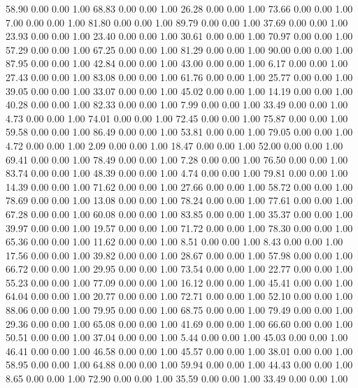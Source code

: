    58.90   0.00   0.00   1.00
   68.83   0.00   0.00   1.00
   26.28   0.00   0.00   1.00
   73.66   0.00   0.00   1.00
    7.00   0.00   0.00   1.00
   81.80   0.00   0.00   1.00
   89.79   0.00   0.00   1.00
   37.69   0.00   0.00   1.00
   23.93   0.00   0.00   1.00
   23.40   0.00   0.00   1.00
   30.61   0.00   0.00   1.00
   70.97   0.00   0.00   1.00
   57.29   0.00   0.00   1.00
   67.25   0.00   0.00   1.00
   81.29   0.00   0.00   1.00
   90.00   0.00   0.00   1.00
   87.95   0.00   0.00   1.00
   42.84   0.00   0.00   1.00
   43.00   0.00   0.00   1.00
    6.17   0.00   0.00   1.00
   27.43   0.00   0.00   1.00
   83.08   0.00   0.00   1.00
   61.76   0.00   0.00   1.00
   25.77   0.00   0.00   1.00
   39.05   0.00   0.00   1.00
   33.07   0.00   0.00   1.00
   45.02   0.00   0.00   1.00
   14.19   0.00   0.00   1.00
   40.28   0.00   0.00   1.00
   82.33   0.00   0.00   1.00
    7.99   0.00   0.00   1.00
   33.49   0.00   0.00   1.00
    4.73   0.00   0.00   1.00
   74.01   0.00   0.00   1.00
   72.45   0.00   0.00   1.00
   75.87   0.00   0.00   1.00
   59.58   0.00   0.00   1.00
   86.49   0.00   0.00   1.00
   53.81   0.00   0.00   1.00
   79.05   0.00   0.00   1.00
    4.72   0.00   0.00   1.00
    2.09   0.00   0.00   1.00
   18.47   0.00   0.00   1.00
   52.00   0.00   0.00   1.00
   69.41   0.00   0.00   1.00
   78.49   0.00   0.00   1.00
    7.28   0.00   0.00   1.00
   76.50   0.00   0.00   1.00
   83.74   0.00   0.00   1.00
   48.39   0.00   0.00   1.00
    4.74   0.00   0.00   1.00
   79.81   0.00   0.00   1.00
   14.39   0.00   0.00   1.00
   71.62   0.00   0.00   1.00
   27.66   0.00   0.00   1.00
   58.72   0.00   0.00   1.00
   78.69   0.00   0.00   1.00
   13.08   0.00   0.00   1.00
   78.24   0.00   0.00   1.00
   77.61   0.00   0.00   1.00
   67.28   0.00   0.00   1.00
   60.08   0.00   0.00   1.00
   83.85   0.00   0.00   1.00
   35.37   0.00   0.00   1.00
   39.97   0.00   0.00   1.00
   19.57   0.00   0.00   1.00
   71.72   0.00   0.00   1.00
   78.30   0.00   0.00   1.00
   65.36   0.00   0.00   1.00
   11.62   0.00   0.00   1.00
    8.51   0.00   0.00   1.00
    8.43   0.00   0.00   1.00
   17.56   0.00   0.00   1.00
   39.82   0.00   0.00   1.00
   28.67   0.00   0.00   1.00
   57.98   0.00   0.00   1.00
   66.72   0.00   0.00   1.00
   29.95   0.00   0.00   1.00
   73.54   0.00   0.00   1.00
   22.77   0.00   0.00   1.00
   55.23   0.00   0.00   1.00
   77.09   0.00   0.00   1.00
   16.12   0.00   0.00   1.00
   45.41   0.00   0.00   1.00
   64.04   0.00   0.00   1.00
   20.77   0.00   0.00   1.00
   72.71   0.00   0.00   1.00
   52.10   0.00   0.00   1.00
   88.06   0.00   0.00   1.00
   79.95   0.00   0.00   1.00
   68.75   0.00   0.00   1.00
   79.49   0.00   0.00   1.00
   29.36   0.00   0.00   1.00
   65.08   0.00   0.00   1.00
   41.69   0.00   0.00   1.00
   66.60   0.00   0.00   1.00
   50.51   0.00   0.00   1.00
   37.04   0.00   0.00   1.00
    5.44   0.00   0.00   1.00
   45.03   0.00   0.00   1.00
   46.41   0.00   0.00   1.00
   46.58   0.00   0.00   1.00
   45.57   0.00   0.00   1.00
   38.01   0.00   0.00   1.00
   58.95   0.00   0.00   1.00
   64.88   0.00   0.00   1.00
   59.94   0.00   0.00   1.00
   44.43   0.00   0.00   1.00
    8.65   0.00   0.00   1.00
   72.90   0.00   0.00   1.00
   35.59   0.00   0.00   1.00
   33.49   0.00   0.00   1.00
